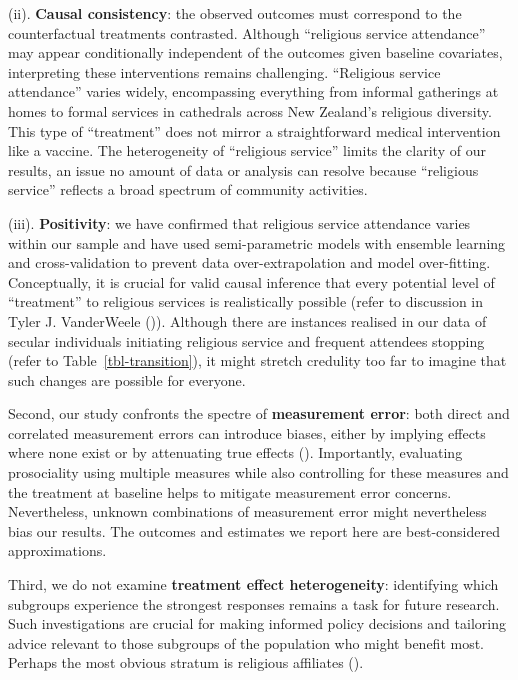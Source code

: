 \documentclass[
  single column]{article}
\begin{document}
(ii). \textbf{Causal consistency}: the observed outcomes must correspond
to the counterfactual treatments contrasted. Although ``religious
service attendance'' may appear conditionally independent of the
outcomes given baseline covariates, interpreting these interventions
remains challenging. ``Religious service attendance'' varies widely,
encompassing everything from informal gatherings at homes to formal
services in cathedrals across New Zealand's religious diversity. This
type of ``treatment'' does not mirror a straightforward medical
intervention like a vaccine. The heterogeneity of ``religious service''
limits the clarity of our results, an issue no amount of data or
analysis can resolve because ``religious service'' reflects a broad
spectrum of community activities.

(iii). \textbf{Positivity}: we have confirmed that religious service
attendance varies within our sample and have used semi-parametric models
with ensemble learning and cross-validation to prevent data
over-extrapolation and model over-fitting. Conceptually, it is crucial
for valid causal inference that every potential level of ``treatment''
to religious services is realistically possible (refer to discussion in
Tyler J. VanderWeele
()). Although
there are instances realised in our data of secular individuals
initiating religious service and frequent attendees stopping (refer to
Table~\ref{tbl-transition}), it might stretch credulity too far to
imagine that such changes are possible for everyone.

Second, our study confronts the spectre of \textbf{measurement error}:
both direct and correlated measurement errors can introduce biases,
either by implying effects where none exist or by attenuating true
effects (). Importantly, evaluating prosociality using multiple
measures while also controlling for these measures and the treatment at
baseline helps to mitigate measurement error concerns. Nevertheless,
unknown combinations of measurement error might nevertheless bias our
results. The outcomes and estimates we report here are best-considered
approximations.

Third, we do not examine \textbf{treatment effect heterogeneity}:
identifying which subgroups experience the strongest responses remains a
task for future research. Such investigations are crucial for making
informed policy decisions and tailoring advice relevant to those
subgroups of the population who might benefit most. Perhaps the most
obvious stratum is religious affiliates
().
\end{document}

